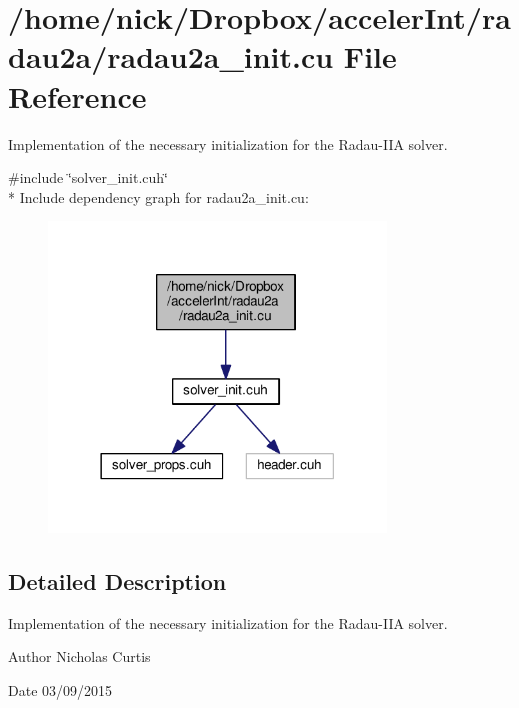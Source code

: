 \hypertarget{radau2a__init_8cu}{}\section{/home/nick/\+Dropbox/acceler\+Int/radau2a/radau2a\+\_\+init.cu File Reference}
\label{radau2a__init_8cu}


Implementation of the necessary initialization for the Radau-\/\+I\+IA solver.  


{\ttfamily \#include \char`\"{}solver\+\_\+init.\+cuh\char`\"{}}\\*
Include dependency graph for radau2a\+\_\+init.\+cu\+:
\nopagebreak
\begin{figure}[H]
\begin{center}
\leavevmode
\includegraphics[width=254pt]{radau2a__init_8cu__incl}
\end{center}
\end{figure}


\subsection{Detailed Description}
Implementation of the necessary initialization for the Radau-\/\+I\+IA solver. 

\begin{DoxyAuthor}{Author}
Nicholas Curtis 
\end{DoxyAuthor}
\begin{DoxyDate}{Date}
03/09/2015 
\end{DoxyDate}
